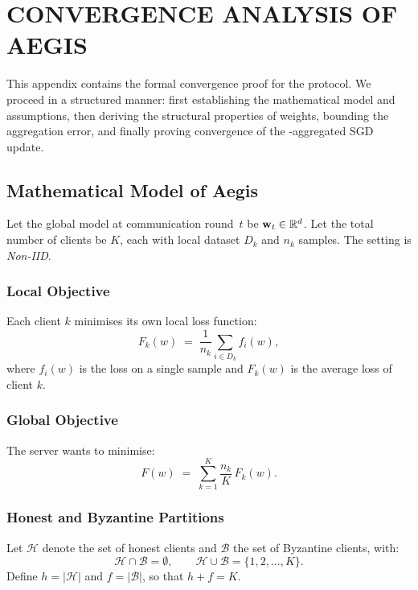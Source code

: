 \documentclass[../main]{subfiles}
\begin{document}
\chapter{CONVERGENCE ANALYSIS OF AEGIS}
\label{app:proofs}

This appendix contains the formal convergence proof for the \aegis{}
protocol. We proceed in a structured manner: first establishing the
mathematical model and assumptions, then deriving the structural properties
of \aegis{} weights, bounding the aggregation error, and finally proving
convergence of the \aegis{}-aggregated SGD update.

\section{Mathematical Model of Aegis}
\label{app:model}

Let the global model at communication round~$t$ be $\mathbf{w}_t \in \mathbb{R}^d$.
Let the total number of clients be $K$, each with local dataset
$D_k$ and $n_k$ samples. The setting is \emph{Non-IID}.

\subsection{Local Objective}

Each client $k$ minimises its own local loss function:
\begin{equation}
    F_k(w) \;=\; \frac{1}{n_k} \sum_{i \in D_k} f_i(w),
    \label{eq:local_obj}
\end{equation}
where $f_i(w)$ is the loss on a single sample and $F_k(w)$ is the
average loss of client $k$.

\subsection{Global Objective}

The server wants to minimise:
\begin{equation}
    F(w) \;=\; \sum_{k=1}^{K} \frac{n_k}{K}\, F_k(w).
    \label{eq:global_obj}
\end{equation}
\subsection{Honest and Byzantine Partitions}

Let $\mathcal{H}$ denote the set of honest clients and
$\mathcal{B}$ the set of Byzantine clients, with:
\[
    \mathcal{H} \cap \mathcal{B} = \emptyset,
    \qquad
    \mathcal{H} \cup \mathcal{B} = \{1, 2, \ldots, K\}.
\]
Define $h = |\mathcal{H}|$ and $f = |\mathcal{B}|$, so that $h + f = K$.
\end{document}
